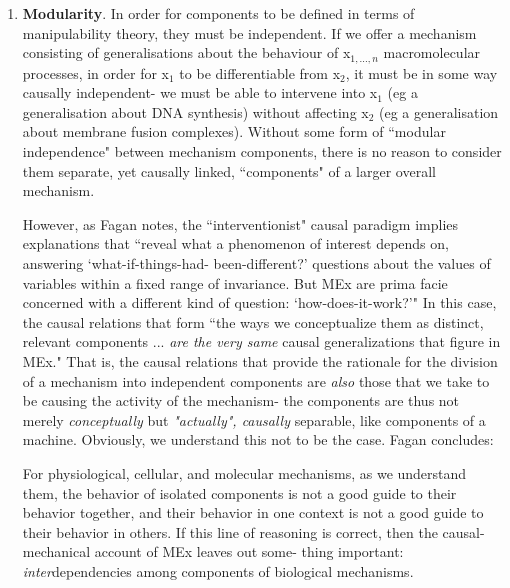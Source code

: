 \begin{enumerate}
\item \textbf{Modularity}. In order for components to be defined in terms of manipulability theory, they must be independent. If we offer a mechanism consisting of generalisations about the behaviour of x$_{1,...,n}$ macromolecular processes, in order for x$_1$ to be differentiable from x$_2$, it must be in some way causally independent- we must be able to intervene into x$_1$ (eg a generalisation about DNA synthesis) without  affecting x$_2$ (eg a generalisation about membrane fusion complexes). Without some form of ``modular independence" between mechanism components, there is no reason to consider them separate, yet causally linked, ``components" of a larger overall mechanism.

However, as Fagan notes, the ``interventionist" causal paradigm implies explanations that ``reveal what a phenomenon of interest depends on, answering ‘what-if-things-had-
been-different?’ questions about the values of variables within a fixed range of invariance. But MEx are prima facie concerned with a different kind of question: ‘how-does-it-work?’" \cite[p.106]{Fagan2013} In this case, the causal relations that form ``the ways we conceptualize them as distinct, relevant components ... \textit{are the very same} causal generalizations that figure in MEx." \cite[p.106]{Fagan2013} That is, the causal relations that provide the rationale for the division of a mechanism into independent components are \textit{also} those that we take to be causing the activity of the mechanism- the components are thus not merely \textit{conceptually} but \textit{"actually", causally} separable, like components of a machine. Obviously, we understand this not to be the case. Fagan concludes:

\begin{longquote}
For physiological, cellular, and molecular mechanisms,
as we understand them, the behavior of isolated components is not a
good guide to their behavior together, and their behavior in one context
is not a good guide to their behavior in others. If this line of reasoning
is correct, then the causal-mechanical account of MEx leaves out some-
thing important: \textit{inter}dependencies among components of biological
mechanisms.
\cite[p.106]{Fagan2013}
\end{longquote}


\end{enumerate}
